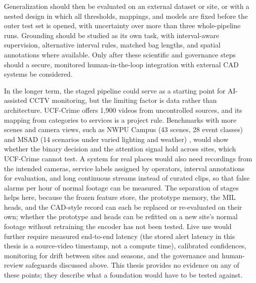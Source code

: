 Generalization should then be evaluated on an external dataset or site, or with
a nested design in which all thresholds, mappings, and models are fixed before
the outer test set is opened, with uncertainty over more than three
whole-pipeline runs. Grounding should be studied as its own task, with
interval-aware supervision, alternative interval rules, matched bag lengths, and
spatial annotations where available. Only after these scientific and governance
steps should a secure, monitored human-in-the-loop integration with external CAD
systems be considered.

In the longer term, the staged pipeline could serve as a starting point for AI-assisted CCTV monitoring, but the limiting factor is data rather than architecture. UCF-Crime offers 1,900 videos from uncontrolled sources, and its mapping from categories to services is a project rule. Benchmarks with more scenes and camera views, such as NWPU Campus (43 scenes, 28 event classes) \cite{cao2023new} and MSAD (14 scenarios under varied lighting and weather) \cite{zhu2024advancing}, would show whether the binary decision and the attention signal hold across sites, which UCF-Crime cannot test. A system for real places would also need recordings from the intended cameras, service labels assigned by operators, interval annotations for evaluation, and long continuous streams instead of curated clips, so that false alarms per hour of normal footage can be measured. The separation of stages helps here, because the frozen feature store, the prototype memory, the MIL heads, and the CAD-style record can each be replaced or re-evaluated on their own; whether the prototype and heads can be refitted on a new site's normal footage without retraining the encoder has not been tested. Live use would further require measured end-to-end latency (the stored alert latency in this thesis is a source-video timestamp, not a compute time), calibrated confidences, monitoring for drift between sites and seasons, and the governance and human-review safeguards discussed above. This thesis provides no evidence on any of these points; they describe what a foundation would have to be tested against.
